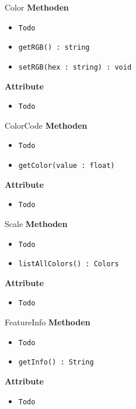     \begin{Class}{Color}
        \textbf{Methoden}
        \begin{itemize}
            \item \texttt{Todo}
            \item \texttt{getRGB() : string}
            \item \texttt{setRGB(hex : string) : void}
        \end{itemize}
        
        \textbf{Attribute}
        \begin{itemize}
            \item \texttt{Todo}
        \end{itemize}
    \end{Class}

    \begin{Class}{ColorCode}
        \textbf{Methoden}
        \begin{itemize}
            \item \texttt{Todo}
            \item \texttt{getColor(value : float)}
        \end{itemize}
        
        \textbf{Attribute}
        \begin{itemize}
            \item \texttt{Todo}
        \end{itemize}
    \end{Class}

    \begin{Class}{Scale}
        \textbf{Methoden}
        \begin{itemize}
            \item \texttt{Todo}
            \item \texttt{listAllColors() : Colors}
        \end{itemize}
        
        \textbf{Attribute}
        \begin{itemize}
            \item \texttt{Todo}
        \end{itemize}
    \end{Class}

    \begin{Class}{FeatureInfo}
        \textbf{Methoden}
        \begin{itemize}
            \item \texttt{Todo}
            \item \texttt{getInfo() : String}
        \end{itemize}
        
        \textbf{Attribute}
        \begin{itemize}
            \item \texttt{Todo}
        \end{itemize}
    \end{Class}

